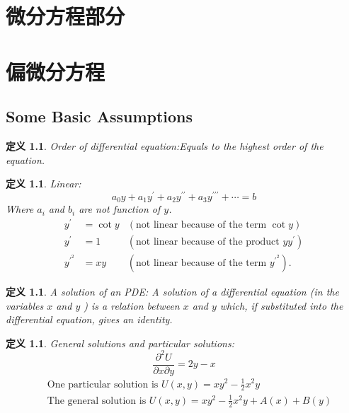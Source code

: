 \documentclass[10pt, a4paper, oneside]{ctexbook}
\newtheorem{definition}[theorem]{定义}
\begin{document}
\chapter*{微分方程部分}
\chapter{偏微分方程}
\section{Some Basic Assumptions}
\begin{definition}
    Order of differential equation:\rm  Equals to the highest order of the equation.
\end{definition}
\begin{definition}
    Linear: \rm 
    \begin{equation*}
        a_{0} y+a_{1} y^{\prime}+a_{2} y^{\prime \prime}+a_{3} y^{\prime \prime \prime}+\cdots=b
    \end{equation*}
    Where $a_i$ and $b_i$ are not function of $y$.
    \begin{equation*}
        \begin{aligned}
        y^{\prime} &=\cot y &(\text {not linear because of the term } \cot y) \\
        y^{\prime} &=1 &\left(\text {not linear because of the product } y y^{\prime}\right) \\
        y^{\prime^{2}} &=x y  &(\text {not linear because of the term } y^{\prime^{2}}) .
        \end{aligned}
        \end{equation*}
\end{definition}
\begin{definition}
    A solution of an PDE: \rm
    A solution of a differential equation (in the variables $x$ and $y$ ) is a relation between $x$ and $y$ which, if substituted into the differential equation, gives an identity.
\end{definition}
\begin{definition}
    General solutions and particular solutions: \rm
    $$\frac{\partial^{2} U}{\partial x \partial y}=2 y-x$$
    $$
    \begin{aligned}
        &\text { One particular solution is } U(x, y)=x y^{2}-\frac{1}{2} x^{2} y \\
        &\text { The general solution is } U(x, y)=x y^{2}-\frac{1}{2} x^{2} y+A(x) + B(y)
    \end{aligned}
    $$
\end{definition}
\end{document}
